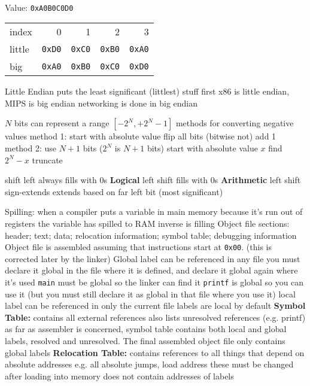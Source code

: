 \documentclass[12pt]{article}
\begin{document}
\begin{spacing}{0.8}
\begin{multicols*}{2}
\begin{flushleft}
\begin{outline}[longenum]
\\
Value: \verb|0xA0B0C0D0|\\
  \1 
  \begin{tabular}{l r r r r}
  index  & 0 & 1 & 2 & 3 \\
  little & \verb|0xD0| & \verb|0xC0| & \verb|0xB0| & \verb|0xA0| \\
  big    & \verb|0xA0| & \verb|0xB0| & \verb|0xC0| & \verb|0xD0| \\
  \end{tabular}
    \2 Little Endian puts the least significant (littlest) stuff first
  \1 x86 is little endian, MIPS is big endian
  \1 networking is done in big endian

  \1 $N$ bits can represent a range $[ -2^N, +2^N - 1 ]$
  \1 methods for converting negative values
  \1 method 1:
    \2 start with absolute value
    \2 flip all bits (bitwise not)
    \2 add 1
  \1 method 2:
    \2 use $N+1$ bits ($2^N$ is $N+1$ bits)
    \2 start with absolute value $x$
    \2 find $2^N - x$
    \2 truncate

  \1 shift left always fills with 0s
  \1 \textbf{Logical} left shift fills with 0s
  \1 \textbf{Arithmetic} left shift sign-extends
    \2 extends based on far left bit (most significant)
 
  \1 Spilling: when a compiler puts a variable in main memory because it's run out of registers
    \2 the variable has spilled to RAM
    \2 inverse is filling
  \1 Object file sections: header; text; data; relocation information; symbol table; debugging information
    \2 Object file is assembled assuming that instructions start at \verb|0x00|. (this is corrected later by the linker)
  \1 Global label can be referenced in any file
    \2 you must declare it global in the file where it is defined, and declare it global again where it's used
    \2 \verb|main| must be global so the linker can find it
    \2 \verb|printf| is global so you can use it (but you must still declare it as global in that file where you use it)
  \1 local label can be referenced in only the current file
    \2 labels are local by default
  \1 \textbf{Symbol Table:} contains all external references
    \2 also lists unresolved references (e.g. printf)
    \2 as far as assembler is concerned, symbol table contains both local and global labels, resolved and unresolved.
    \2 The final assembled object file only contains global labels
  \1 \textbf{Relocation Table:} contains references to all things that depend on absolute addresses
    \2 e.g. all absolute jumps, load address
    \2 these must be changed after loading into memory
    \2 does not contain addresses of labels



\end{outline}
\end{flushleft}
\end{multicols*}
\end{spacing}
\end{document}
